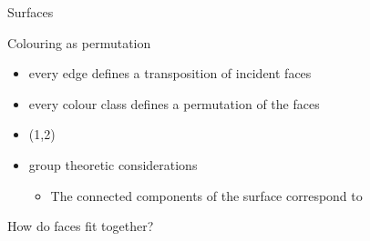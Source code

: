 \documentclass[11pt, handout]{beamer}
\begin{document}
\begin{frame}{Surfaces }
\begin{frame}{Colouring as permutation}
{        \begin{itemize}
            \item<6->[$\leadsto$] every edge defines a transposition of incident faces
            \item<9->[$\leadsto$] every colour class defines a permutation of the faces
            \item<7-> \textcolor{\colB}{(1,2)}
            \item<12->[$\leadsto$] group theoretic considerations
                \begin{itemize}
                    \item<13-> The connected components of the surface correspond to 
                \end{itemize}
        \end{itemize}
    }
\end{frame}
         

\begin{frame}{How do faces fit together?}

\end{frame}
\end{frame}
\end{document}
